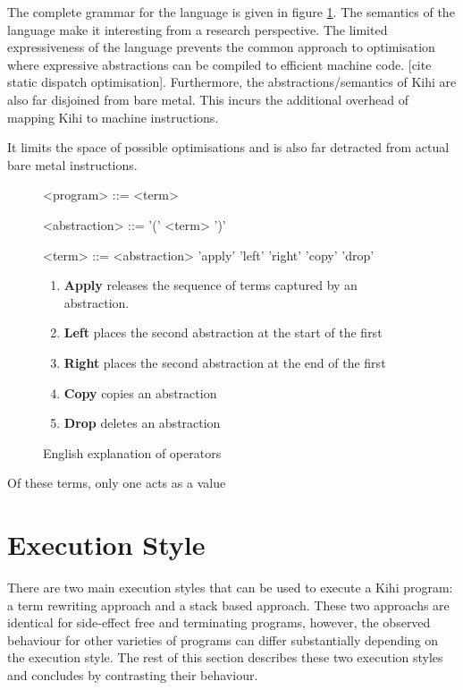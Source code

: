 The complete grammar for the language is given
in figure \ref{fig:grammar}. The semantics of the language make it
interesting from a research perspective. The limited expressiveness of
the language prevents the common approach to optimisation where expressive
abstractions can be compiled to efficient machine code. [cite static
dispatch optimisation]. Furthermore, the abstractions/semantics of Kihi are
also far disjoined from bare metal. This incurs the additional overhead of
mapping Kihi to machine instructions.

It limits the space of possible
optimisations and is also far detracted from actual bare metal instructions.


\begin{figure}[htb]       
    \centering
    \begin{grammar}
    <program> ::= { <term> }

    <abstraction> ::= '(' <term> ')'

    <term> ::= <abstraction>
        \alt 'apply'
        \alt 'left'
        \alt 'right'
        \alt 'copy'
        \alt 'drop'
    
      \end{grammar}
    \caption{}
    \label{fig:grammar}
\end{figure}



\begin{figure}
    \centering
    \begin{enumerate}
        \item \textbf{Apply} releases the sequence of terms captured by an abstraction.
        \item \textbf{Left} places the second abstraction at the start of the first
        \item \textbf{Right} places the second abstraction at the end of the first
        \item \textbf{Copy} copies an abstraction
        \item \textbf{Drop} deletes an abstraction
    \end{enumerate}
    \caption{English explanation of operators}
    \label{fig:operator explanation}
\end{figure}

Of these terms, only one acts as a value

\section{Execution Style}
There are two main execution styles that can be used to execute
a Kihi program: a term rewriting approach and a stack based 
approach. These two approachs are identical for side-effect
free and terminating programs, however, the observed
behaviour for other varieties of programs can differ
substantially depending on the execution style. The rest of 
this section describes these two execution styles and 
concludes by contrasting their behaviour.

